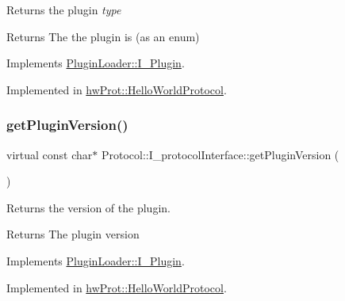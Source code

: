 Returns the plugin {\itshape type} 

\begin{DoxyReturn}{Returns}
The the plugin is (as an enum) 
\end{DoxyReturn}


Implements \mbox{\hyperlink{classPluginLoader_1_1I__Plugin_aa7d2ca3f7a8551c590a7cbda0f1648f5}{Plugin\+Loader\+::\+I\+\_\+\+Plugin}}.



Implemented in \mbox{\hyperlink{classhwProt_1_1HelloWorldProtocol_aa3a9c97bcf934fa61cd69e19b93a2689}{hw\+Prot\+::\+Hello\+World\+Protocol}}.

\mbox{\label{classProtocol_1_1I__protocolInterface_abbdaeb43eba4c18b57e6f7010d9209bc}} 
\subsubsection{\texorpdfstring{getPluginVersion()}{getPluginVersion()}}
{\footnotesize\ttfamily virtual const char$\ast$ Protocol\+::\+I\+\_\+protocol\+Interface\+::get\+Plugin\+Version (\begin{DoxyParamCaption}{ }\end{DoxyParamCaption})\hspace{0.3cm}{\ttfamily [pure virtual]}}



Returns the version of the plugin. 

\begin{DoxyReturn}{Returns}
The plugin version 
\end{DoxyReturn}


Implements \mbox{\hyperlink{classPluginLoader_1_1I__Plugin_a43fb739a14ea1cc5ca6a77896a5f7b8f}{Plugin\+Loader\+::\+I\+\_\+\+Plugin}}.



Implemented in \mbox{\hyperlink{classhwProt_1_1HelloWorldProtocol_ab4c559084de5fa090d75672eff462841}{hw\+Prot\+::\+Hello\+World\+Protocol}}.

\mbox{\label{classProtocol_1_1I__protocolInterface_ac55c6c5aa39aa7340c4e74c0ad5ec04e}} 
